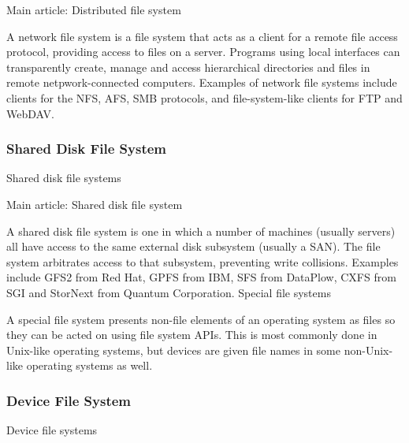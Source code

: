 Main article: Distributed file system



A network file system is a file system that acts as a client for a remote file
access protocol, providing access to files on a server. Programs using local
interfaces can transparently create, manage and access hierarchical directories
and files in remote netpwork-connected computers. Examples of network file
systems include clients for the NFS, AFS, SMB protocols, and file-system-like
clients for FTP and WebDAV.\



\subsubsectionend

\subsubsection{Shared Disk File System}
\label{sssec:shared_disk_file_system}


Shared disk file systems



Main article: Shared disk file system



A shared disk file system is one in which a number of machines (usually servers)
all have access to the same external disk subsystem (usually a SAN). The file
system arbitrates access to that subsystem, preventing write collisions.
Examples include GFS2 from Red Hat, GPFS from IBM, SFS from DataPlow, CXFS from
SGI and StorNext from Quantum Corporation.  Special file systems



A special file system presents non-file elements of an operating system as files
so they can be acted on using file system APIs. This is most commonly done in
Unix-like operating systems, but devices are given file names in some
non-Unix-like operating systems as well.



\subsubsectionend

\subsubsection{Device File System}
\label{sssec:device_file_system}


Device file systems



